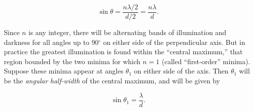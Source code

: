 \begin{equation*}
\sin \theta = \frac{n\lambda/2}{d/2} = \frac{n\lambda}{d}.
\end{equation*}

Since $n$ is any integer, there will be alternating bands of
illumination and darkness for all angles up to 90$^\circ$ on either side of the
perpendicular axis. But in practice the greatest illumination is found
within the ``central maximum,'' that region bounded by the two minima
for which $n = 1$ (called ``first-order'' minima). Suppose these
minima appear at angles $\theta_1$ on either side of the axis. Then
$\theta_1$ will be the \emph{angular half-width} of the central maximum,
and will be given by

\begin{equation*}
\sin \theta_1 = \frac{\lambda}{d}.
\end{equation*}

